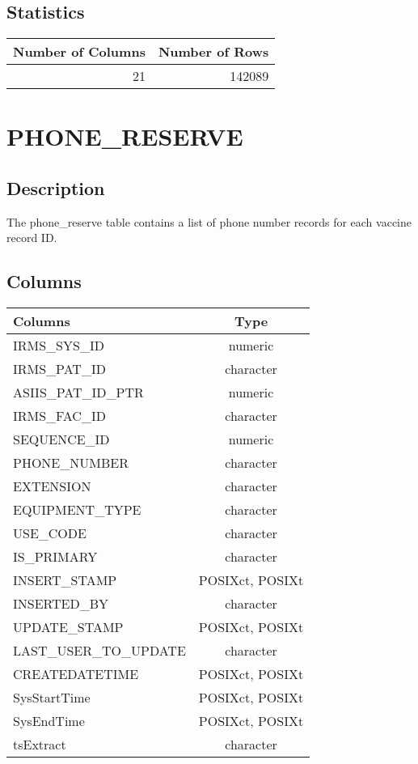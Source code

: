 \documentclass[
  letterpaper,
  DIV=11,
  numbers=noendperiod]{scrreprt}
\begin{document}
\hypertarget{statistics-31}{%
\section*{Statistics}\label{statistics-31}}

\begin{longtable}{rr}
\toprule
Number of Columns & Number of Rows \\ 
\midrule
21 & 142089 \\ 
\bottomrule
\end{longtable}

\hypertarget{phone_reserve}{%
\chapter*{PHONE\_RESERVE}\label{phone_reserve}}

\hypertarget{description-32}{%
\section*{Description}\label{description-32}}

The phone\_reserve table contains a list of phone number records for
each vaccine record ID.

\hypertarget{columns-32}{%
\section*{Columns}\label{columns-32}}

\begin{longtable}{lc}
\toprule
Columns & Type \\ 
\midrule
IRMS\_SYS\_ID & numeric \\ 
IRMS\_PAT\_ID & character \\ 
ASIIS\_PAT\_ID\_PTR & numeric \\ 
IRMS\_FAC\_ID & character \\ 
SEQUENCE\_ID & numeric \\ 
PHONE\_NUMBER & character \\ 
EXTENSION & character \\ 
EQUIPMENT\_TYPE & character \\ 
USE\_CODE & character \\ 
IS\_PRIMARY & character \\ 
INSERT\_STAMP & POSIXct, POSIXt \\ 
INSERTED\_BY & character \\ 
UPDATE\_STAMP & POSIXct, POSIXt \\ 
LAST\_USER\_TO\_UPDATE & character \\ 
CREATEDATETIME & POSIXct, POSIXt \\ 
SysStartTime & POSIXct, POSIXt \\ 
SysEndTime & POSIXct, POSIXt \\ 
tsExtract & character \\ 
\bottomrule
\end{longtable}
\end{document}
